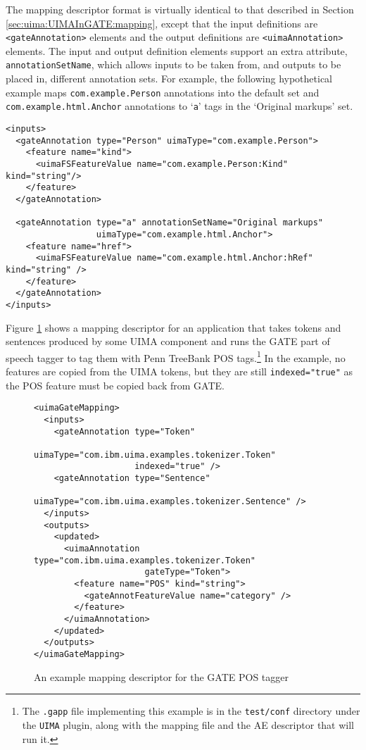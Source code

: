 The mapping descriptor format is virtually identical to that described in
Section \ref{sec:uima:UIMAInGATE:mapping}, except that the input definitions are
\verb|<gateAnnotation>| elements and the output definitions are
\verb|<uimaAnnotation>| elements.  The input and output definition elements
support an extra attribute, \texttt{annotationSetName}, which allows inputs to
be taken from, and outputs to be placed in, different annotation sets.  For
example, the following hypothetical example maps \texttt{com.example.Person}
annotations into the default set and \texttt{com.example.html.Anchor}
annotations to `\texttt{a}' tags in the `Original markups' set.
%
\begin{small}
\begin{verbatim}
<inputs>
  <gateAnnotation type="Person" uimaType="com.example.Person">
    <feature name="kind">
      <uimaFSFeatureValue name="com.example.Person:Kind" kind="string"/>
    </feature>
  </gateAnnotation>

  <gateAnnotation type="a" annotationSetName="Original markups"
                  uimaType="com.example.html.Anchor">
    <feature name="href">
      <uimaFSFeatureValue name="com.example.html.Anchor:hRef" kind="string" />
    </feature>
  </gateAnnotation>
</inputs>
\end{verbatim}
\end{small}

Figure \ref{fig:GATEInUIMA:example} shows a
mapping descriptor for an application that takes tokens and sentences produced
by some UIMA component and runs the GATE part of speech tagger to tag them with
Penn TreeBank POS tags.\footnote{The \texttt{.gapp} file implementing this
example is in the \texttt{test/conf} directory under the \texttt{UIMA} plugin,
along with the mapping file and the AE descriptor that will run it.}  In the
example, no features are copied from the UIMA tokens, but they are still
\texttt{indexed="true"} as the POS feature must be copied back from GATE.
%
\begin{figure}
\begin{small}
\begin{verbatim}
<uimaGateMapping>
  <inputs>
    <gateAnnotation type="Token"
                    uimaType="com.ibm.uima.examples.tokenizer.Token"
                    indexed="true" />
    <gateAnnotation type="Sentence"
                    uimaType="com.ibm.uima.examples.tokenizer.Sentence" />
  </inputs>
  <outputs>
    <updated>
      <uimaAnnotation type="com.ibm.uima.examples.tokenizer.Token"
                      gateType="Token">
        <feature name="POS" kind="string">
          <gateAnnotFeatureValue name="category" />
        </feature>
      </uimaAnnotation>
    </updated>
  </outputs>
</uimaGateMapping>
\end{verbatim}
\end{small}
\caption{An example mapping descriptor for the GATE POS tagger}
\label{fig:GATEInUIMA:example}
\end{figure}

